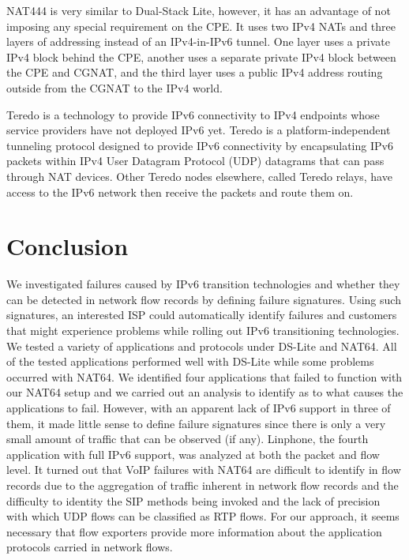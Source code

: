\documentclass{llncs}
\begin{document}
NAT444 \cite{NAT444} is very similar to Dual-Stack Lite, however, it has an advantage of not imposing any special requirement on the CPE. It uses two IPv4 NATs and three layers of addressing instead of an IPv4-in-IPv6 tunnel. One layer uses a private IPv4 block behind the CPE, another uses a separate private IPv4 block between the CPE and CGNAT, and the third layer uses a public IPv4 address routing outside from the CGNAT to the IPv4 world.

Teredo \cite{TEREDO} is a technology to provide IPv6 connectivity to IPv4 endpoints whose service providers have not deployed IPv6 yet. Teredo is a platform-independent tunneling protocol designed to provide IPv6 connectivity by encapsulating IPv6 packets within IPv4 User Datagram Protocol (UDP) datagrams that can pass through NAT devices. Other Teredo nodes elsewhere, called Teredo relays, have access to the IPv6 network then receive the packets and route them on.

\section{Conclusion}
\label{sec:conclusion}

We investigated failures caused by IPv6 transition technologies and whether they can be detected in network flow records by defining failure signatures. Using such signatures, an interested ISP could automatically identify failures and customers that might experience problems while rolling out IPv6 transitioning technologies. We tested a variety of applications and protocols under DS-Lite and NAT64. All of the tested applications performed well with DS-Lite while some problems occurred with NAT64. We identified four applications that failed to function with our NAT64 setup and we carried out an analysis to identify as to what causes the applications to fail. However, with an
apparent lack of IPv6 support in three of them, it made little sense to define failure signatures since there is only a very small amount of traffic that can be observed (if any). Linphone, the fourth application with full IPv6 support, was analyzed at both the packet and flow level. It turned out that VoIP failures with NAT64 are difficult to identify in flow records due to the aggregation of traffic inherent in network flow records and the difficulty to identity the SIP methods being invoked and the lack of precision with which UDP flows can be classified as RTP flows. For our approach, it seems necessary that flow exporters provide more information about the application protocols carried in network flows.
\end{document}
